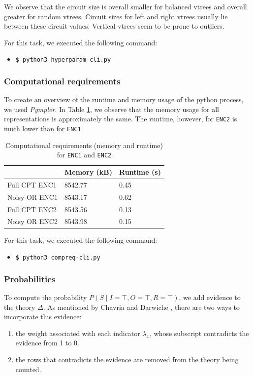 \documentclass{article}
\begin{document}
We observe that the circuit size is overall smaller for balanced vtrees and overall greater for random vtrees. Circuit sizes for left and right  vtrees usually lie between these circuit values. Vertical vtrees seem to be prone to outliers.

For this task, we executed the following command:
\begin{itemize}
	\item[] \texttt{\$ python3 hyperparam-cli.py}
\end{itemize}

\newpage

\subsubsection{Computational requirements}
To create an overview of the runtime and memory usage of the python process, we used \textit{Pympler}. In Table \ref{tab:memory_runtime}, we observe that the memory usage for all representations is approximately the same. The runtime, however, for \texttt{ENC2} is much lower than for \texttt{ENC1}.

\begin{table}[h]
\centering
\begin{tabular}{l | l l}
					&	Memory (kB)	&	Runtime (s)	\\\hline
	Full CPT ENC1	&	8542.77		&	0.45			\\
	Noisy OR ENC1	&	8543.17		&	0.62			\\
	Full CPT ENC2	&	8543.56		&	0.13			\\
	Noisy OR ENC2	&	8543.98		&	0.15			\\
\end{tabular}
\caption{Computational requirements (memory and runtime) for \texttt{ENC1} and \texttt{ENC2}}
\label{tab:memory_runtime}
\end{table}

For this task, we executed the following command:
\begin{itemize}
	\item[] \texttt{\$ python3 compreq-cli.py}
\end{itemize}

\subsubsection{Probabilities}
To compute the probability $P(S \mid I=\top, O = \top, R = \top)$, we add evidence to the theory $\Delta$. As mentioned by Chavria and Darwiche \cite{chavira}, there are two ways to incorporate this evidence:
\begin{enumerate}
	\item the weight associated with each indicator $\lambda_x$, whose subscript contradicts the evidence from 1 to 0.
	\item the rows that contradicts the evidence are removed from the theory being counted.
\end{enumerate}
\end{document}
